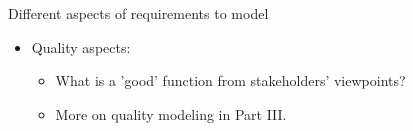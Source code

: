 \begin{Slide}{Different aspects of requirements to model }
\begin{itemize}
\item Quality aspects: 
\begin{itemize}
\item What is a 'good' function from stakeholders' viewpoints?
\item More on quality modeling in Part III.

\end{itemize}
\end{itemize}
\end{Slide}